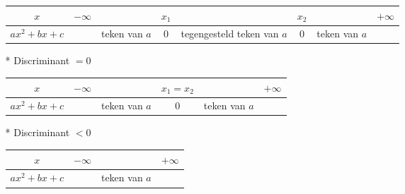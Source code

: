 \begin{itemize}
\begin{itemize}
\begin{tabular}{c|ccccccc}
		$x$ & $-\infty$ & & $x_1$ & & $x_2$ & & $+\infty$\\
		\hline
		$ax^2+bx+c$ & & teken van $a$ & 0& tegengesteld teken van $a$ & 0 & teken van $a$ 		&\\ 	
		\end{tabular}\vskip 1cm
		\item[*] Discriminant $=0$\vskip 0.5cm
		\begin{tabular}{c|ccccc}
		$x$ & $-\infty$ & & $x_1=x_2$ & & $+\infty$\\
		\hline
		$ax^2+bx+c$ & & teken van $a$ & 0 & teken van $a$ & \\		
		\end{tabular}\vskip 1cm
		\item[*] Discriminant $<0$\vskip 0.5cm
		\begin{tabular}{c|ccc}
		$x$ & $-\infty$ &  & $+\infty$\\
		\hline
		$ax^2+bx+c$ & & teken van $a$ & \\		
		\end{tabular}
		\end{itemize}%
		\end{itemize}%

\hypertarget{veeltermfuncties}{}
